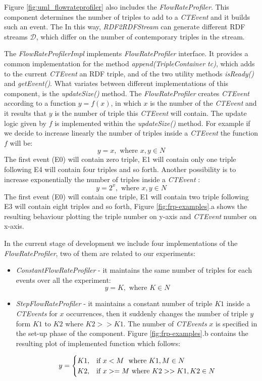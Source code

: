 Figure \ref{fig:uml_flowrateprofiler} also includes the \textit{FlowRateProfiler}. This component determines the number of triples to add to a \textit{CTEvent} and it builds such an event. The In this way, \textit{RDF2RDFStream} can generate different RDF streams $\mathcal{D}$, which differ on the number of contemporary triples in the stream. 



The \textit{FlowRateProfilerImpl} implements \textit{FlowRateProfiler} interface. It provides a common implementation for the method \textit{append(TripleContainer tc)}, which adds to the current \textit{CTEvent} an RDF triple,  and of the two utility methods \textit{isReady()} and \textit{getEvent()}. What variates between different implementations of this component, is the \textit{updateSize()} method. The \textit{FlowRateProfiler} creates \textit{CTEvent} according to a function $y=f(x)$, in which $x$ is the number of the \textit{CTEvent} and it results that $y$ is the number of triple this \textit{CTEvent} will contain. The update logic given by $f$ is implemented within the \textit{updateSize()} method. For example if we decide to increase linearly the number of triples inside a \textit{CTEvent} the function $f$ will be: \[y=x, \text{ where } x,y \in N\]
The first event (E0) will contain zero triple, E1 will contain only one triple following E4 will contain four triples and so forth. Another possibility is to increase exponentially the number of triples inside a \textit{CTEvent} : \[y=2^x, \text{ where } x,y \in N\]The first event (E0) will contain one triple, E1 will contain two triple following E3 will contain eight triples and so forth, Figure \ref{fig:frp-examples}.a shows the resulting behaviour plotting the triple number on y-axis and \textit{CTEvent} number on x-axis.



In the current stage of development we include four implementations of the \textit{FlowRateProfiler}, two of them are related to our experiments: 
\begin{itemize}
\item \textit{ConstantFlowRateProfiler} - it maintains the same number of triples for each events over all the experiment: \\
\[y=K, \text{ where } K \in N \]

\item \textit{StepFlowRateProfiler} - it maintains a constant number of triple $K1$ inside a \textit{CTEvents} for $x$ occurrences, then it suddenly changes the number of triple $y$ form $K1$ to $K2$ where $K2 >> K1$. The number of  \textit{CTEvents} $x$ is specified in the set-up phase of the component.  Figure \ref{fig:frp-examples}.b contains the resulting plot of implemented function which follows:

\[
y=
\begin{cases}
K1, &\text{if $x < M$ } $ where $ K1, M \in N\\
K2, &\text{if $x >= M$} $ where $ K2 >> K1, K2 \in N
\end{cases}
\]


\end{itemize}

